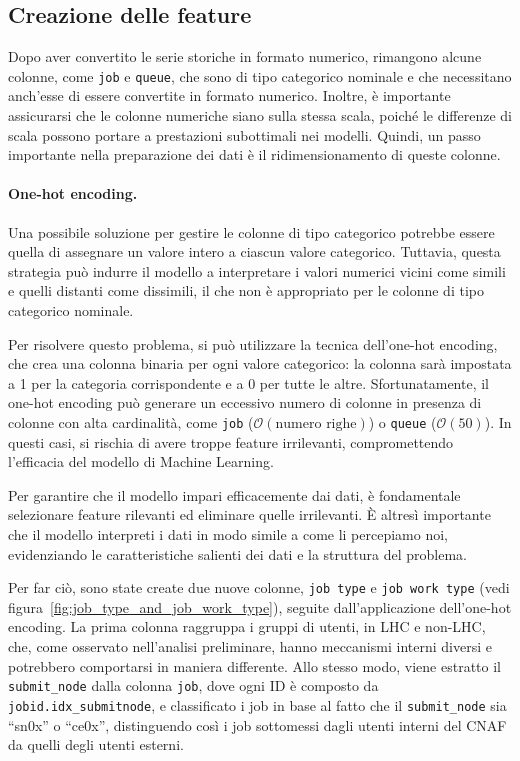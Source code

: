 \subsection{Creazione delle feature}

Dopo aver convertito le serie storiche in formato numerico, rimangono alcune
colonne, come \texttt{job} e \texttt{queue}, che sono di tipo categorico
nominale e che necessitano anch'esse di essere convertite in formato numerico.
Inoltre, è importante assicurarsi che le colonne numeriche siano sulla stessa
scala, poiché le differenze di scala possono portare a prestazioni subottimali
nei modelli. Quindi, un passo importante nella preparazione dei dati è il
ridimensionamento di queste colonne.

\paragraph{One-hot encoding.} 
\label{par:features}

Una possibile soluzione per gestire le colonne di tipo categorico potrebbe
essere quella di assegnare un valore intero a ciascun valore categorico.
Tuttavia, questa strategia può indurre il modello a interpretare i valori
numerici vicini come simili e quelli distanti come dissimili, il che non è
appropriato per le colonne di tipo categorico nominale.

Per risolvere questo problema, si può utilizzare la tecnica dell'one-hot
encoding, che crea una colonna binaria per ogni valore categorico: la colonna
sarà impostata a 1 per la categoria corrispondente e a 0 per tutte le altre.
Sfortunatamente, il one-hot encoding può generare un eccessivo numero di
colonne in presenza di colonne con alta cardinalità, come \texttt{job}
($\mathcal{O}(\text{numero righe})$) o \texttt{queue} ($\mathcal{O}(50)$). In
questi casi, si rischia di avere troppe feature irrilevanti, compromettendo
l'efficacia del modello di Machine Learning. 

Per garantire che il modello impari efficacemente dai dati, è fondamentale
selezionare feature rilevanti ed eliminare quelle irrilevanti. È altresì
importante che il modello interpreti i dati in modo simile a come li
percepiamo noi, evidenziando le caratteristiche salienti dei dati e la
struttura del problema. 

Per far ciò, sono state create due nuove colonne, \texttt{job type} e
\texttt{job work type} (vedi figura~\ref{fig:job_type_and_job_work_type}),
seguite dall'applicazione dell'one-hot encoding. La prima colonna raggruppa i
gruppi di utenti, in LHC e non-LHC, che, come osservato nell'analisi
preliminare, hanno meccanismi interni diversi e potrebbero comportarsi in
maniera differente. Allo stesso modo, viene estratto il \verb|submit_node|
dalla colonna \texttt{job}, dove ogni ID è composto da
\verb|jobid.idx_submitnode|, e classificato i job in base al fatto che il
\verb|submit_node| sia ``sn0x'' o ``ce0x'', distinguendo così i job sottomessi
dagli utenti interni del CNAF da quelli degli utenti esterni.

